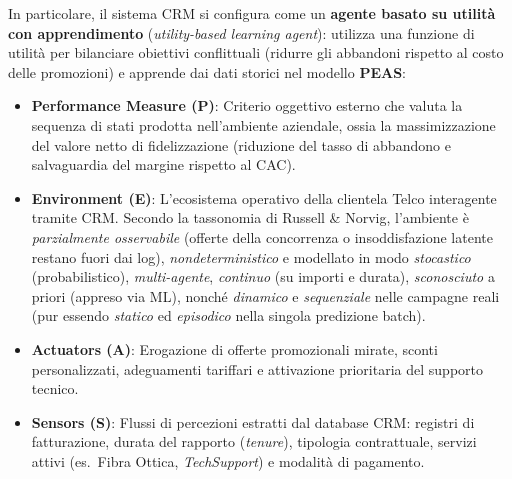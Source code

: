 \documentclass[11pt,a4paper]{article}
\begin{document}
In particolare, il sistema CRM si configura come un \textbf{agente basato su utilità con apprendimento} (\textit{utility-based learning agent}): utilizza una funzione di utilità per bilanciare obiettivi conflittuali (ridurre gli abbandoni rispetto al costo delle promozioni) e apprende dai dati storici nel modello \textbf{PEAS}:
\begin{itemize}
    \item \textbf{Performance Measure (P)}: Criterio oggettivo esterno che valuta la sequenza di stati prodotta nell'ambiente aziendale, ossia la massimizzazione del valore netto di fidelizzazione (riduzione del tasso di abbandono e salvaguardia del margine rispetto al CAC).
    \item \textbf{Environment (E)}: L'ecosistema operativo della clientela Telco interagente tramite CRM. Secondo la tassonomia di Russell \& Norvig, l'ambiente è \textit{parzialmente osservabile} (offerte della concorrenza o insoddisfazione latente restano fuori dai log), \textit{nondeterministico} e modellato in modo \textit{stocastico} (probabilistico), \textit{multi-agente}, \textit{continuo} (su importi e durata), \textit{sconosciuto} a priori (appreso via ML), nonché \textit{dinamico} e \textit{sequenziale} nelle campagne reali (pur essendo \textit{statico} ed \textit{episodico} nella singola predizione batch).
    \item \textbf{Actuators (A)}: Erogazione di offerte promozionali mirate, sconti personalizzati, adeguamenti tariffari e attivazione prioritaria del supporto tecnico.
    \item \textbf{Sensors (S)}: Flussi di percezioni estratti dal database CRM: registri di fatturazione, durata del rapporto (\textit{tenure}), tipologia contrattuale, servizi attivi (es.\ Fibra Ottica, \textit{TechSupport}) e modalità di pagamento.
\end{itemize}
\end{document}
